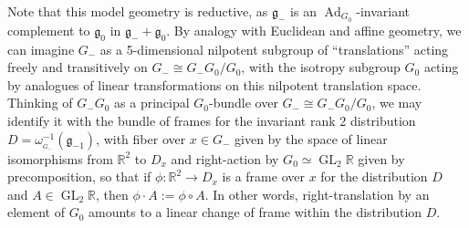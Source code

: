 \documentclass[12pt,a4paper]{amsart}
\theoremstyle{definition}
\DeclareMathOperator{\Ad}{Ad}
\DeclareMathOperator{\GLin}{GL}
\newcommand{\MC}[1]{\omega_{{}_{#1}}}
\begin{document}
Note that this model geometry is reductive, as $\mathfrak{g}_-$ is an $\Ad_{G_0}$-invariant complement to $\mathfrak{g}_0$ in $\mathfrak{g}_-+\mathfrak{g}_0$. By analogy with Euclidean and affine geometry, we can imagine $G_-$ as a 5-dimensional nilpotent subgroup of ``translations'' acting freely and transitively on $G_-\cong G_-G_0/G_0$, with the isotropy subgroup $G_0$ acting by analogues of linear transformations on this nilpotent translation space. Thinking of $G_-G_0$ as a principal $G_0$-bundle over $G_-\cong G_-G_0/G_0$, we may identify it with the bundle of frames for the invariant rank 2 distribution $D=\MC{G_-}^{-1}(\mathfrak{g}_{-1})$, with fiber over $x\in G_-$ given by the space of linear isomorphisms from $\mathbb{R}^2$ to $D_x$ and right-action by $G_0\simeq\GLin_2\mathbb{R}$ given by precomposition, so that if $\phi:\mathbb{R}^2\to D_x$ is a frame over $x$ for the distribution $D$ and $A\in\GLin_2\mathbb{R}$, then $\phi\cdot A:=\phi\circ A$. In other words, right-translation by an element of $G_0$ amounts to a linear change of frame within the distribution $D$.
\end{document}
